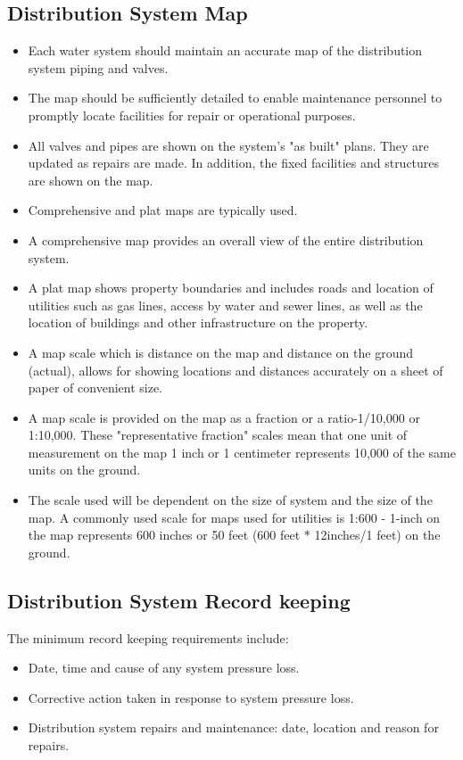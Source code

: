 \subsection{Distribution System Map} 
\begin{itemize}
\item Each water system should maintain an accurate map of the distribution system piping and valves. 
\item The map should be sufficiently detailed to enable maintenance personnel to promptly locate facilities for repair or operational purposes.
\item All valves and pipes are shown on the system's "as built" plans.  They are updated as repairs are made.  In addition, the fixed facilities and structures are shown on the map.
\item Comprehensive  and plat maps are typically used.
\item A comprehensive map provides an overall view of the entire distribution system.
\item A plat map  shows property boundaries and includes roads and location of utilities such as gas lines, access by water and sewer lines, as well as the location of buildings and other infrastructure on the property.
\item A map scale which is distance on the map and distance on the ground (actual), allows for showing locations and distances accurately on a sheet of paper of convenient size. 
\item A map scale is provided on the map as a fraction or a ratio-1/10,000 or 1:10,000. These "representative fraction" scales mean that one unit of measurement on the map 1 inch or 1 centimeter represents 10,000 of the same units on the ground.
\item The scale used will be dependent on the size of system and the size of the map.  A commonly used scale for maps used for utilities is 1:600 - 1-inch on the map represents 600 inches or 50 feet (600 feet * 12inches/1 feet) on the ground.
\end{itemize}

\subsection{Distribution System Record keeping} 
The minimum record keeping requirements include:
\begin{itemize}
\item Date, time and cause of any system pressure loss.
\item Corrective action taken in response to system pressure loss.
\item Distribution system repairs and maintenance: date, location and reason for repairs.
\end{itemize}

